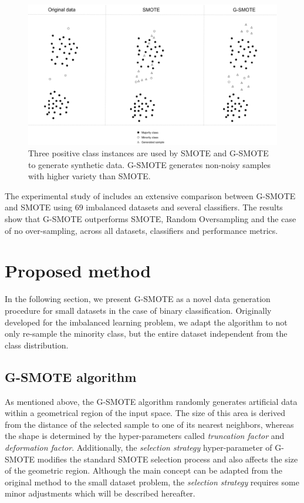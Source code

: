 \documentclass[parskip=full]{scrartcl}
\begin{document}
\begin{figure}[H]
	\centering
	\includegraphics[width=1\linewidth]{../analysis/smote_vs_gsmote}
	\caption{Three positive class instances are used by SMOTE and G-SMOTE 
	to generate synthetic data. G-SMOTE generates non-noisy samples 
	with higher variety than SMOTE.}
	\label{fig:smotevsgsmote}
\end{figure}

The experimental study of \cite{Douzas.2019} includes an extensive comparison
between G-SMOTE and SMOTE using 69 imbalanced datasets and several classifiers.
The results show that G-SMOTE outperforms SMOTE, Random Oversampling and the
case of no over-sampling, across all datasets, classifiers and performance
metrics.

\section{Proposed method}

In the following section, we present G-SMOTE as a novel data generation
procedure for small datasets in the case of binary classification. Originally
developed for the imbalanced learning problem, we adapt the algorithm to not
only re-sample the minority class, but the entire dataset independent from the
class distribution. 

\subsection{G-SMOTE algorithm}

As mentioned above, the G-SMOTE algorithm randomly generates artificial data
within a geometrical region of the input space. The size of this area is derived
from the distance of the selected sample to one of its nearest neighbors,
whereas the shape is determined by the hyper-parameters called
\textit{truncation factor} and \textit{deformation factor}. Additionally, the
\textit{selection strategy} hyper-parameter  of G-SMOTE modifies the standard
SMOTE selection process and also affects the size of the geometric region.
Although the main concept can be adapted from the original method to the small
dataset problem, the \textit{selection strategy} requires some minor adjustments
which will be described hereafter.
\end{document}
